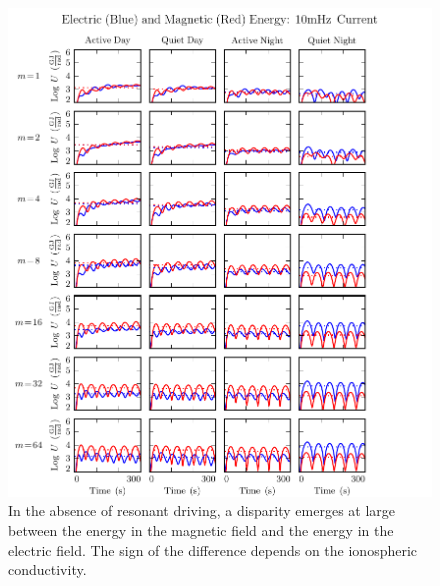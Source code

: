 \begin{figure}[H]
    \centering
    \includegraphics[width=\textwidth]{figures/U_BE_010mHz.pdf}
    \caption[Current-Driven Electric and Magnetic Energy: 10mHz]{
      In the absence of resonant driving, a disparity emerges at large \azm between the energy in the magnetic field and the energy in the electric field. The sign of the difference depends on the ionospheric conductivity. 
    }
    \label{fig_U_BE_010mHz}
\end{figure}


